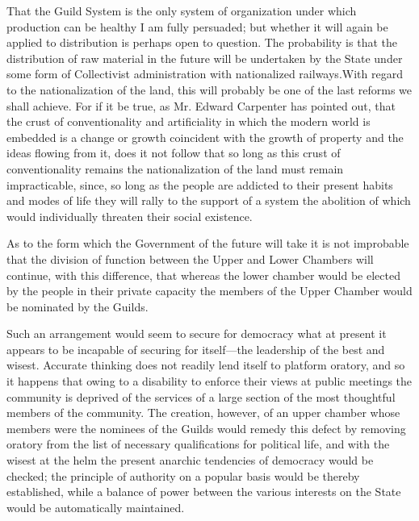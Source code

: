 \documentclass{book}
\begin{document}
That the Guild System is the only system of organization under which production can be healthy I am fully persuaded; but whether it will again be applied to distribution is perhaps open to question. The probability is that the distribution of raw material in the future will be undertaken by the State under some form of Collectivist administration with nationalized railways.\footnotemark[1] With regard to the nationalization of the land, this will probably be one of the last reforms we shall achieve. For if it be true, as Mr. Edward Carpenter has pointed out, that the crust of conventionality and artificiality in which the modern world is embedded is a change or growth coincident with the growth of property and the ideas flowing from it, does it not follow that so long as this crust of conventionality remains the nationalization of the land must remain impracticable, since, so long as the people are addicted to their present habits and modes of life they will rally to the support of a system the abolition of which would individually threaten their social existence.

As to the form which the Government of the future will take it is not improbable that the division of function between the Upper and Lower Chambers will continue, with this difference, that whereas the lower chamber would be elected by the people in their private capacity the members of the Upper Chamber would be nominated by the Guilds.

Such an arrangement would seem to secure for democracy what at present it appears to be incapable of securing for itself—the leadership of the best and wisest. Accurate thinking does not readily lend itself to platform oratory, and so it happens that owing to a disability to enforce their views at public meetings the community is deprived of the services of a large section of the most thoughtful members of the community. The creation, however, of an upper chamber whose members were the nominees of the Guilds would remedy this defect by removing oratory from the list of necessary qualifications for political life, and with the wisest at the helm the present anarchic tendencies of democracy would be checked; the principle of authority on a popular basis would be thereby established, while a balance of power between the various interests on the State would be automatically maintained.
\end{document}

